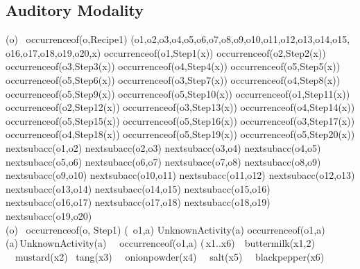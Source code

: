 \subsection{Auditory Modality}
\begin{center}

(\forall o) \ occurrence\textunderscore of(o,Recipe1) \supset (\exists o1,o2,o3,o4,o5,o6,o7,o8,o9,o10,o11,o12,o13,o14,o15,\\o16,o17,o18,o19,o20,x) \land occurrence\textunderscore of(o1,Step1(x)) \land occurrence\textunderscore of(o2,Step2(x)) \land occurrence\textunderscore of(o3,Step3(x)) \land occurrence\textunderscore of(o4,Step4(x)) \land occurrence\textunderscore of(o5,Step5(x)) \land occurrence\textunderscore of(o5,Step6(x)) \land occurrence\textunderscore of(o3,Step7(x)) \land occurrence\textunderscore of(o4,Step8(x)) \land occurrence\textunderscore of(o5,Step9(x)) \land occurrence\textunderscore of(o5,Step10(x)) \land occurrence\textunderscore of(o1,Step11(x)) \land occurrence\textunderscore of(o2,Step12(x)) \land occurrence\textunderscore of(o3,Step13(x)) \land occurrence\textunderscore of(o4,Step14(x)) \land occurrence\textunderscore of(o5,Step15(x)) \land occurrence\textunderscore of(o5,Step16(x)) \land occurrence\textunderscore of(o3,Step17(x)) \land occurrence\textunderscore of(o4,Step18(x)) \land occurrence\textunderscore of(o5,Step19(x)) \land occurrence\textunderscore of(o5,Step20(x)) \land
next\textunderscore subacc(o1,o2) \land next\textunderscore subacc(o2,o3) \land next\textunderscore subacc(o3,o4) \land next\textunderscore subacc(o4,o5) \land
next\textunderscore subacc(o5,o6) \land next\textunderscore subacc(o6,o7) \land next\textunderscore subacc(o7,o8) \land next\textunderscore subacc(o8,o9) \land next\textunderscore subacc(o9,o10) \land next\textunderscore subacc(o10,o11) \land next\textunderscore subacc(o11,o12) \land
next\textunderscore subacc(o12,o13) \land next\textunderscore subacc(o13,o14) \land next\textunderscore subacc(o14,o15) \land next\textunderscore subacc(o15,o16) \land next\textunderscore subacc(o16,o17) \land next\textunderscore subacc(o17,o18) \land next\textunderscore subacc(o18,o19) \land next\textunderscore subacc(o19,o20)\\ 

(\forall o) \ occurrence\textunderscore of(o, Step1) \supset (\exists\, o1,a) \land Unknown\textunderscore Activity(a) \land occurrence\textunderscore of(o1,a) \\

(\forall a)\,Unknown\textunderscore Activity(a) \  \land \  occurrence\textunderscore of(o1,a) \supset (\exists\,x1..x6)\  \ buttermilk(x1,2) \ \land \  mustard(x2) \land \ tang(x3) \   \land \ onionpowder(x4)  \  \land \  salt(x5)  \  \land \  blackpepper(x6) \\


\end{center}
